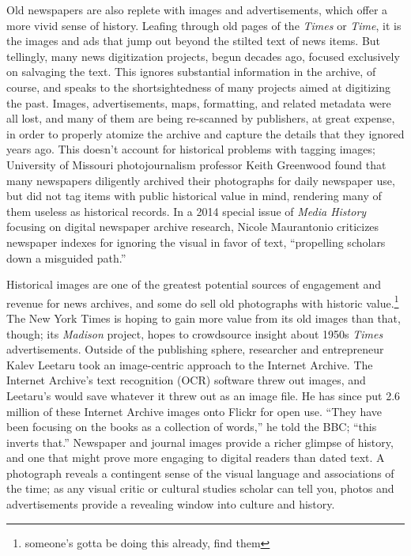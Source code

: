 Old newspapers are also replete with images and advertisements, which offer a more vivid sense of history. Leafing through old pages of the \emph{Times} or \emph{Time}, it is the images and ads that jump out beyond the stilted text of news items. But tellingly, many news digitization projects, begun decades ago, focused exclusively on salvaging the text. This ignores substantial information in the archive, of course, and speaks to the shortsightedness of many projects aimed at digitizing the past. Images, advertisements, maps, formatting, and related metadata were all lost, and many of them are being re-scanned by publishers, at great expense, in order to properly atomize the archive and capture the details that they ignored years ago. This doesn't account for historical problems with tagging images; University of Missouri photojournalism professor Keith Greenwood found that many newspapers diligently archived their photographs for daily newspaper use, but did not tag items with public historical value in mind, rendering many of them useless as historical records.\autocite{greenwood_digital_2011} In a 2014 special issue of \emph{Media History} focusing on digital newspaper archive research, Nicole Maurantonio criticizes newspaper indexes for ignoring the visual in favor of text, ``propelling scholars down a misguided path.''\autocite[90]{maurantonio_archiving_2014}

Historical images are one of the greatest potential sources of engagement and revenue for news archives, and some do sell old photographs with historic value.\footnote{someone's gotta be doing this already, find them} The New York Times is hoping to gain more value from its old images than that, though; its \emph{Madison} project, hopes to crowdsource insight about 1950s \emph{Times} advertisements.\autocite{_madison_????} Outside of the publishing sphere, researcher and entrepreneur Kalev Leetaru took an image-centric approach to the Internet Archive. The Internet Archive's text recognition (OCR) software threw out images, and Leetaru's would save whatever it threw out as an image file. He has since put 2.6 million of these Internet Archive images onto Flickr for open use. ``They have been focusing on the books as a collection of words,'' he told the BBC; ``this inverts that.''\autocite{kelion_millions_2014} Newspaper and journal images provide a richer glimpse of history, and one that might prove more engaging to digital readers than dated text. A photograph reveals a contingent sense of the visual language and associations of the time; as any visual critic or cultural studies scholar can tell you, photos and advertisements provide a revealing window into culture and history.\autocite{sontag_photography_1977,barthes_rhetoric_1978}

